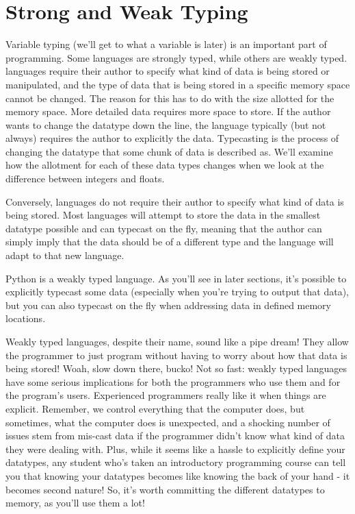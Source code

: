 \section{Strong and Weak Typing}
Variable typing (we'll get to what a variable is later) is an important part of programming. Some languages are strongly typed, while others are weakly typed.  languages require their author to specify what kind of data is being stored or manipulated, and the type of data that is being stored in a specific memory space cannot be changed. The reason for this has to do with the size allotted for the memory space. More detailed data requires more space to store. If the author wants to change the datatype down the line, the language typically (but not always) requires the author to explicitly  the data. Typecasting is the process of changing the datatype that some chunk of data is described as. We'll examine how the allotment for each of these data types changes when we look at the difference between integers and floats.\par
Conversely,  languages do not require their author to specify what kind of data is being stored. Most languages will attempt to store the data in the smallest datatype possible and can typecast on the fly, meaning that the author can simply imply that the data should be of a different type and the language will adapt to that new language.\par
Python is a weakly typed language. As you'll see in later sections, it's possible to explicitly typecast some data (especially when you're trying to output that data), but you can also typecast on the fly when addressing data in defined memory locations.\par
Weakly typed languages, despite their name, sound like a pipe dream! They allow the programmer to just program without having to worry about how that data is being stored! Woah, slow down there, bucko! Not so fast: weakly typed languages have some serious implications for both the programmers who use them and for the program's users. Experienced programmers really like it when things are explicit. Remember, we control everything that the computer does, but sometimes, what the computer does is unexpected, and a shocking number of issues stem from mis-cast data if the programmer didn't know what kind of data they were dealing with. Plus, while it seems like a hassle to explicitly define your datatypes, any student who's taken an introductory programming course can tell you that knowing your datatypes becomes like knowing the back of your hand - it becomes second nature! So, it's worth committing the different datatypes to memory, as you'll use them a lot!\par
